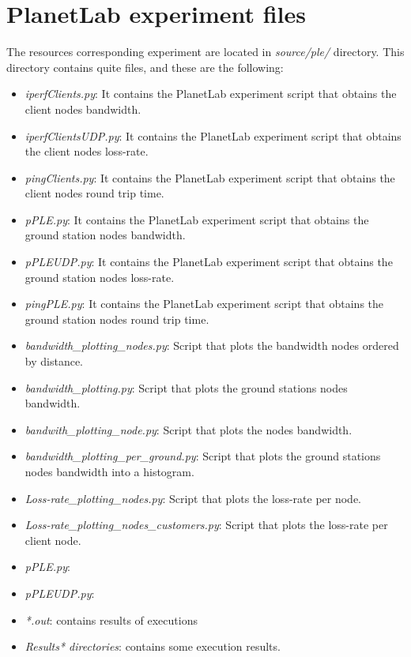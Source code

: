 \section{PlanetLab experiment files}
The resources corresponding \pl experiment are located in \emph{source/ple/} directory.
This directory contains quite files, and these are the following:
\begin{itemize}
\item \emph{iperfClients.py}: It contains the PlanetLab experiment script that obtains the client nodes bandwidth.
\item \emph{iperfClientsUDP.py}: It contains the PlanetLab experiment script that obtains the client nodes loss-rate.
\item \emph{pingClients.py}: It contains the PlanetLab experiment script that obtains the client nodes round trip time.
\item \emph{pPLE.py}: It contains the PlanetLab experiment script that obtains the ground station nodes bandwidth.
\item \emph{pPLEUDP.py}: It contains the PlanetLab experiment script that obtains the ground station nodes loss-rate.
\item \emph{pingPLE.py}: It contains the PlanetLab experiment script that obtains the ground station nodes round trip time.
\item \emph{bandwidth\_plotting\_nodes.py}: Script that plots the bandwidth nodes ordered by distance.
\item \emph{bandwidth\_plotting.py}: Script that plots the ground stations nodes bandwidth.
\item \emph{bandwith\_plotting\_node.py}: Script that plots the nodes bandwidth.
\item \emph{bandwidth\_plotting\_per\_ground.py}: Script that plots the ground stations nodes bandwidth into a histogram.
\item \emph{Loss-rate\_plotting\_nodes.py}: Script that plots the loss-rate per node.
\item \emph{Loss-rate\_plotting\_nodes\_customers.py}: Script that plots the loss-rate per client node.
\item \emph{pPLE.py}: 
\item \emph{pPLEUDP.py}:
\item \emph{*.out}: contains results of executions
\item \emph{Results* directories}: contains some execution results.
\end{itemize}